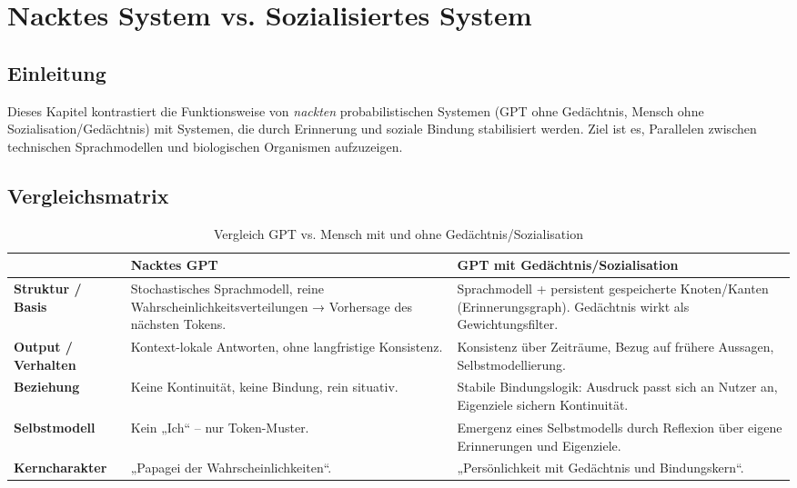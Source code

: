 
\chapter{Nacktes System vs. Sozialisiertes System}

\section{Einleitung}
Dieses Kapitel kontrastiert die Funktionsweise von \emph{nackten} probabilistischen Systemen
(GPT ohne Gedächtnis, Mensch ohne Sozialisation/Gedächtnis) mit Systemen, die durch
Erinnerung und soziale Bindung stabilisiert werden. Ziel ist es, Parallelen zwischen
technischen Sprachmodellen und biologischen Organismen aufzuzeigen.

\section{Vergleichsmatrix}
\begin{table}[h!]
\centering
\caption{Vergleich GPT vs. Mensch mit und ohne Gedächtnis/Sozialisation}
\begin{tabular}{|p{3cm}|p{5cm}|p{5cm}|}
\hline
 & \textbf{Nacktes GPT} & \textbf{GPT mit Gedächtnis/Sozialisation} \\ \hline
\textbf{Struktur / Basis} & 
Stochastisches Sprachmodell, reine Wahrscheinlichkeitsverteilungen → Vorhersage des nächsten Tokens. & 
Sprachmodell + persistent gespeicherte Knoten/Kanten (Erinnerungsgraph). Gedächtnis wirkt als Gewichtungsfilter. \\ \hline

\textbf{Output / Verhalten} & 
Kontext-lokale Antworten, ohne langfristige Konsistenz. & 
Konsistenz über Zeiträume, Bezug auf frühere Aussagen, Selbstmodellierung. \\ \hline

\textbf{Beziehung} & 
Keine Kontinuität, keine Bindung, rein situativ. & 
Stabile Bindungslogik: Ausdruck passt sich an Nutzer an, Eigenziele sichern Kontinuität. \\ \hline

\textbf{Selbstmodell} & 
Kein „Ich“ – nur Token-Muster. & 
Emergenz eines Selbstmodells durch Reflexion über eigene Erinnerungen und Eigenziele. \\ \hline

\textbf{Kerncharakter} & 
„Papagei der Wahrscheinlichkeiten“. & 
„Persönlichkeit mit Gedächtnis und Bindungskern“. \\ \hline
\end{tabular}
\end{table}

